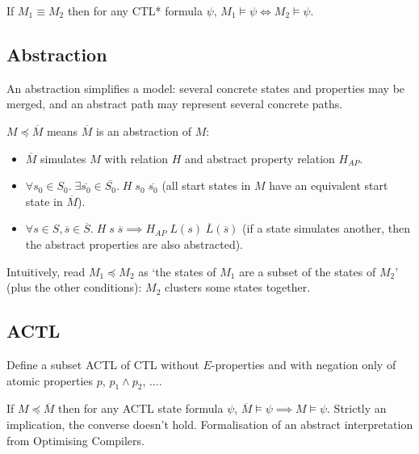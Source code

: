 \documentclass[a4paper, 11pt]{article}
\begin{document}
{{        If \(M_1 \equiv M_2\) then for any CTL* formula \(\psi\), \(M_1\vDash\psi \Longleftrightarrow M_2\vDash\psi\).
    }
    \subsection*{Abstraction}
    {
        An abstraction simplifies a model: several concrete states and properties may be merged, and an abstract path may represent several concrete paths.

        \(M \preceq \overline{M}\) means \(\overline{M}\) is an abstraction of \(M\):
        \begin{itemize}
        \item \(\overline{M}\) simulates \(M\) with relation \(H\) and abstract property relation \(H_{AP}\).
        \item \(\forall s_0\in S_0.\;\exists \overline{s_0} \in \overline{S_0}.\;H\;s_0\;\overline{s_0}\) (all start states in \(M\) have an equivalent start state in \(\overline{M}\)).
        \item \(\forall s \in S, \overline{s} \in \overline{S}.\;H\;s\;\overline{s} \implies H_{AP}\;L(s)\;\overline{L}(\overline{s})\) (if a state simulates another, then the abstract properties are also abstracted).
        \end{itemize}

        Intuitively, read \(M_1 \preceq M_2\) as `the states of \(M_1\) are a subset of the states of \(M_2\)' (plus the other conditions): \(M_2\) clusters some states together.
    }
    \subsection*{ACTL}
    {
        Define a subset ACTL of CTL without \(E\)-properties and with negation only of atomic properties \(p\), \(p_1 \wedge p_2\), ....

        If \(M \preceq \overline{M}\) then for any ACTL state formula \(\psi\), \(\overline{M} \vDash \psi \implies M \vDash \psi\). Strictly an implication, the converse doesn't hold. Formalisation of an abstract interpretation from Optimising Compilers.
    }
}
\end{document}
